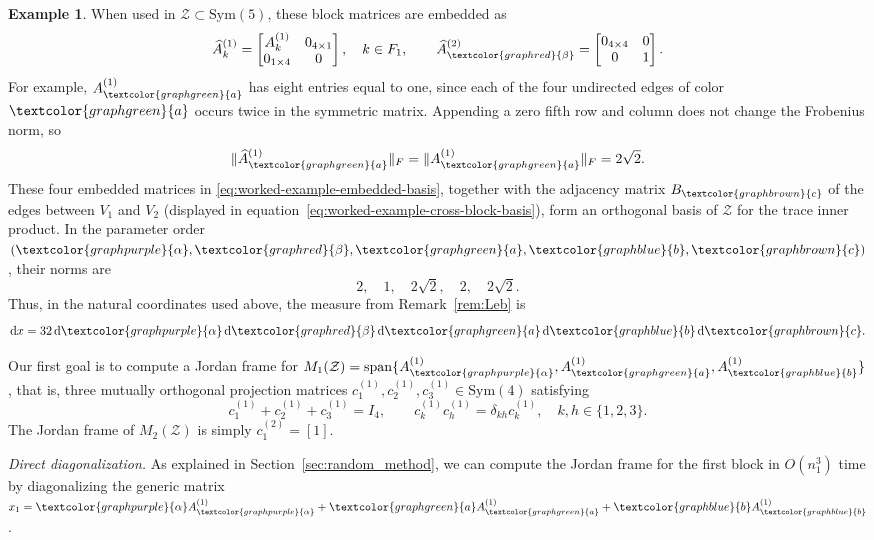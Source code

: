 \documentclass[12pt]{amsart}
\theoremstyle{plain}
\theoremstyle{definition}
\newtheorem{example}[theorem]{Example}
\theoremstyle{remark}
\newcommand{\1}{\mathbf{1}}
\newcommand{\dd}{\mathrm{d}}
\begin{document}
\begin{example}
When used in $\mathcal Z\subset\mathrm{Sym}(5)$, these block
matrices are embedded as
\begin{equation}\label{eq:worked-example-embedded-basis}
\widehat A^{(1)}_k=
\begin{bmatrix}
A^{(1)}_k&0_{4\times1}\\
0_{1\times4}&0
\end{bmatrix},
\quad k\in F_1,
\qquad
\widehat A^{(2)}_{\textcolor{graphred}{\beta}}=
\begin{bmatrix}
0_{4\times4}&0\\
0&1
\end{bmatrix}.
\end{equation}
For example, $A^{(1)}_{\textcolor{graphgreen}{a}}$ has eight
entries equal to one, since each of the four undirected edges
of color $\textcolor{graphgreen}{a}$ occurs twice in the symmetric
matrix. Appending a zero fifth row and column does not change
the Frobenius norm, so
\[
\|\widehat A^{(1)}_{\textcolor{graphgreen}{a}}\|_F
=\|A^{(1)}_{\textcolor{graphgreen}{a}}\|_F
=2\sqrt2.
\]
These four embedded matrices in
\eqref{eq:worked-example-embedded-basis},
together with the adjacency matrix
$B_{\textcolor{graphbrown}{c}}$ of the edges between $V_1$ and $V_2$
(displayed in equation~\ref{eq:worked-example-cross-block-basis}),
form an orthogonal basis of $\mathcal Z$ for the trace inner product.
In the parameter order $(\textcolor{graphpurple}{\alpha},\textcolor{graphred}{\beta},\textcolor{graphgreen}{a},\textcolor{graphblue}{b},\textcolor{graphbrown}{c})$, their norms are
\[
2,\quad 1,\quad 2\sqrt2,\quad 2,\quad 2\sqrt2.
\]
Thus, in the natural coordinates used above, the measure from Remark~\ref{rem:Leb} is
\begin{equation*}
\dd x=32\,\dd\textcolor{graphpurple}{\alpha}\,
\dd\textcolor{graphred}{\beta}\,
\dd\textcolor{graphgreen}{a}\,
\dd\textcolor{graphblue}{b}\,
\dd\textcolor{graphbrown}{c}.
\end{equation*}

Our first goal is to compute a Jordan frame for $M_1(\mathcal Z)=\mathrm{span}\{A^{(1)}_{\textcolor{graphpurple}{\alpha}},A^{(1)}_{\textcolor{graphgreen}{a}},A^{(1)}_{\textcolor{graphblue}{b}}\}$, that is, three mutually orthogonal projection matrices $c_1^{(1)},c_2^{(1)},c_3^{(1)}\in\mathrm{Sym}(4)$ satisfying
\[
c_1^{(1)}+c_2^{(1)}+c_3^{(1)}=I_4,
\qquad
c_k^{(1)}c_h^{(1)}=\delta_{kh}c_k^{(1)},
\quad k,h\in\{1,2,3\}.
\]
The Jordan frame of $M_2(\mathcal Z)$ is simply $c_1^{(2)}=[1]$.


\noindent\emph{Direct diagonalization.}
As explained in Section~\ref{sec:random_method}, we can compute the Jordan frame for the first block in $O(n_1^3)$ time by diagonalizing the generic matrix $x_1=\textcolor{graphpurple}{\alpha} A^{(1)}_{\textcolor{graphpurple}{\alpha}}+\textcolor{graphgreen}{a}A^{(1)}_{\textcolor{graphgreen}{a}}+\textcolor{graphblue}{b}A^{(1)}_{\textcolor{graphblue}{b}}$.


\end{example}
\end{document}
